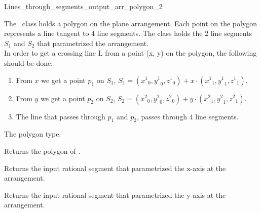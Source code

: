 \begin {ccRefClass} {Lines_through_segments_output_arr_polygon_2}
    
\ccDefinition 

The \ccRefName\ class holds a polygon on the plane arrangement. Each point on the polygon represents a line tangent to 4 line segments. The class holds the 2 line segments $S_1$ and $S_2$ that parametrized the arrangement.\\
In order to get a crossing line L from a point (x, y) on the polygon, the following should be done:

\begin{enumerate}
\item 
From $x$ we get a point $p_1$ on $S_1$, $S_1 = ({x^1}_0,{y^1}_0,{z^1}_0) + x \cdot ({x^1}_1,{y^1}_1,{z^1}_1)$.
\item
From $y$ we get a point $p_2$ on $S_2$, $S_2 = ({x^2}_0,{y^2}_0,{z^2}_0) + y \cdot ({x^2}_1,{y^2}_1,{z^2}_1)$.
\item
The line that passes through $p_1$ and $p_2$, passes through 4 line segments.
\end{enumerate}

\ccTypes
{} {The polygon type.}

\ccAccessFunctions
{}

         {Returns the polygon of \ccVar{}.}

         {Returns the input rational segment that parametrized the x-axis at the arrangement.}

         {Returns the input rational segment that parametrized the y-axis at the arrangement.}

\ccSeeAlso
{}\\
\\
\\
\\
\\


\end{ccRefClass} 

